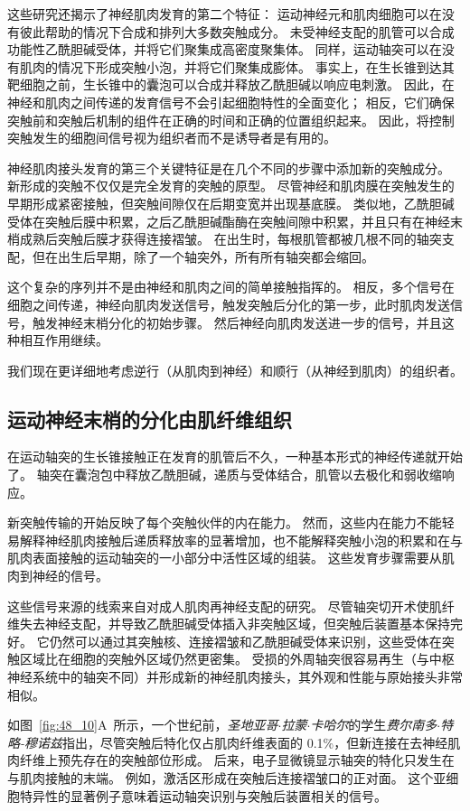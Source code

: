这些研究还揭示了神经肌肉发育的第二个特征：
运动神经元和肌肉细胞可以在没有彼此帮助的情况下合成和排列大多数突触成分。
未受神经支配的肌管可以合成功能性乙酰胆碱受体，并将它们聚集成高密度聚集体。
同样，运动轴突可以在没有肌肉的情况下形成突触小泡，并将它们聚集成膨体。
事实上，在生长锥到达其靶细胞之前，生长锥中的囊泡可以合成并释放乙酰胆碱以响应电刺激。
因此，在神经和肌肉之间传递的发育信号不会引起细胞特性的全面变化；
相反，它们确保突触前和突触后机制的组件在正确的时间和正确的位置组织起来。
因此，将控制突触发生的细胞间信号视为组织者而不是诱导者是有用的。


神经肌肉接头发育的第三个关键特征是在几个不同的步骤中添加新的突触成分。
新形成的突触不仅仅是完全发育的突触的原型。
尽管神经和肌肉膜在突触发生的早期形成紧密接触，但突触间隙仅在后期变宽并出现基底膜。
类似地，乙酰胆碱受体在突触后膜中积累，之后乙酰胆碱酯酶在突触间隙中积累，并且只有在神经末梢成熟后突触后膜才获得连接褶皱。
在出生时，每根肌管都被几根不同的轴突支配，但在出生后早期，除了一个轴突外，所有所有轴突都会缩回。


这个复杂的序列并不是由神经和肌肉之间的简单接触指挥的。 
相反，多个信号在细胞之间传递，神经向肌肉发送信号，触发突触后分化的第一步，此时肌肉发送信号，触发神经末梢分化的初始步骤。
然后神经向肌肉发送进一步的信号，并且这种相互作用继续。


我们现在更详细地考虑逆行（从肌肉到神经）和顺行（从神经到肌肉）的组织者。



\subsection{运动神经末梢的分化由肌纤维组织}

在运动轴突的生长锥接触正在发育的肌管后不久，一种基本形式的神经传递就开始了。
轴突在囊泡包中释放乙酰胆碱，递质与受体结合，肌管以去极化和弱收缩响应。


新突触传输的开始反映了每个突触伙伴的内在能力。
然而，这些内在能力不能轻易解释神经肌肉接触后递质释放率的显著增加，也不能解释突触小泡的积累和在与肌肉表面接触的运动轴突的一小部分中活性区域的组装。
这些发育步骤需要从肌肉到神经的信号。


这些信号来源的线索来自对成人肌肉再神经支配的研究。
尽管轴突切开术使肌纤维失去神经支配，并导致乙酰胆碱受体插入非突触区域，但突触后装置基本保持完好。
它仍然可以通过其突触核、连接褶皱和乙酰胆碱受体来识别，这些受体在突触区域比在细胞的突触外区域仍然更密集。
受损的外周轴突很容易再生（与中枢神经系统中的轴突不同）并形成新的神经肌肉接头，其外观和性能与原始接头非常相似。


如图~\ref{fig:48_10}A~所示，一个世纪前，\textit{圣地亚哥$\cdot$拉蒙$\cdot$卡哈尔}的学生\textit{费尔南多$\cdot$特略-穆诺兹}指出，尽管突触后特化仅占肌肉纤维表面的 0.1\%，但新连接在去神经肌肉纤维上预先存在的突触部位形成。
后来，电子显微镜显示轴突的特化只发生在与肌肉接触的末端。
例如，激活区形成在突触后连接褶皱口的正对面。
这个亚细胞特异性的显著例子意味着运动轴突识别与突触后装置相关的信号。


